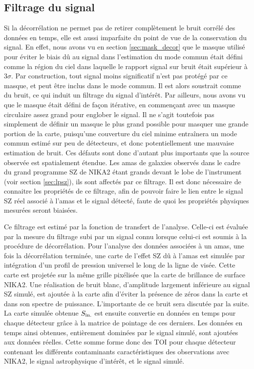 \subsection{Filtrage du signal}\label{sec:transfer_function}

Si la décorrélation ne permet pas de retirer complètement le bruit corrélé des données en temps, elle est aussi imparfaite du point de vue de la conservation du signal.
En effet, nous avons vu en section \ref{sec:mask_decor} que le masque utilisé pour éviter le biais dû au signal dans l'estimation du mode commun était défini comme la région du ciel dans laquelle le rapport signal sur bruit était supérieur à $3\sigma$.
Par construction, tout signal moins significatif n'est pas protégé par ce masque, et peut être inclus dans le mode commun.
Il est alors soustrait comme du bruit, ce qui induit un filtrage du signal d'intérêt.
Par ailleurs, nous avons vu que le masque était défini de façon itérative, en commençant avec un masque circulaire assez grand pour englober le signal.
Il ne s'agit toutefois pas simplement de définir un masque le plus grand possible pour masquer une grande portion de la carte, puisqu'une couverture du ciel minime entraînera un mode commun estimé sur peu de détecteurs, et donc potentiellement une mauvaise estimation de bruit.
Ces défauts sont donc d'autant plus importants que la source observée est spatialement étendue.
Les amas de galaxies observés dans le cadre du grand programme SZ de NIKA2 étant grands devant le lobe de l'instrument (voir section \ref{sec:lpsz}), ils sont affectés par ce filtrage.
Il est donc nécessaire de connaitre les propriétés de ce filtrage, afin de pouvoir faire le lien entre le signal SZ réel associé à l'amas et le signal détecté, faute de quoi les propriétés physiques mesurées seront biaisées.

Ce filtrage est estimé par la fonction de transfert de l'analyse.
Celle-ci est évaluée par la mesure du filtrage subi par un signal connu lorsque celui-ci est soumis à la procédure de décorrélation.
Pour l'analyse des données associées à un amas, une fois la décorrélation terminée, une carte de l'effet SZ dû à l'amas est simulée par intégration d'un profil de pression universel le long de la ligne de visée.
Cette carte est projetée sur la même grille pixélisée que la carte de brillance de surface NIKA2.
Une réalisation de bruit blanc, d'amplitude largement inférieure au signal SZ simulé, est ajoutée à la carte afin d'éviter la présence de zéros dans la carte et dans son spectre de puissance.
L'importante de ce bruit sera discutée par la suite.
La carte simulée obtenue $S_{\rm in.}$ est ensuite convertie en données en temps pour chaque détecteur grâce à la matrice de pointage de ces derniers.
Les données en temps ainsi obtenues, entièrement dominées par le signal simulé, sont ajoutées aux données réelles.
Cette somme forme donc des TOI pour chaque détecteur contenant les différents contaminants caractéristiques des observations avec NIKA2, le signal astrophysique d'intérêt, et le signal simulé.

